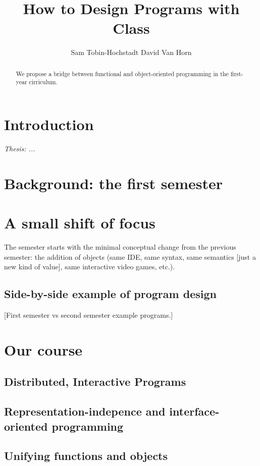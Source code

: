 \documentclass[submission,copyright]{eptcs}
\title{How to Design Programs with Class}
\author{Sam Tobin-Hochstadt \quad\qquad David Van Horn
\institute{Northeastern University\\
Boston, Massachusetts, USA}
\email{\{samth,dvanhorn\}@ccs.neu.edu}
}
\begin{document}
\maketitle

\begin{abstract}
We propose a bridge between functional and object-oriented programming
in the first-year cirriculum.
\end{abstract}

\section{Introduction}

\emph{Thesis: ...}

\section{Background: the first semester}

\section{A small shift of focus}

The semester starts with the minimal conceptual change from the
previous semester: the addition of objects (same IDE, same syntax,
same semantics [just a new kind of value], same interactive video
games, etc.).

\subsection{Side-by-side example of program design}

[First semester vs second semester example programs.]

\section{Our course}

\subsection{Distributed, Interactive Programs}

\subsection{Representation-indepence and interface-oriented programming}

\subsection{Unifying functions and objects}
\end{document}
